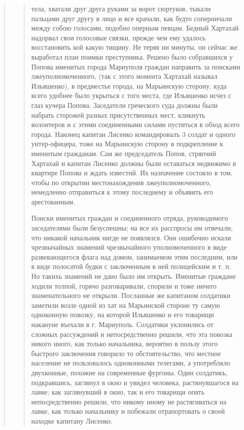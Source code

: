 \begin{quote}
\begin{quote}
тела, хватали друг друга руками за ворот сюртуков, тыкали пальцами друг другу в
лицо и все крачали, как будто соперничали между собою голосами, подобно оперным
певцам. 
Бедный Хартахай надорвал свои голосовые связки, прежде чем ему удалось
восстановить кой какую тищину. Не теряя ни минуты, он сейчас же выработал план
поимки преступника. Решено было собравшихся у Попова именитых города Мариуполя
граждан направить за поисками лжеуполномоченного, (так с этого момента Хартахай
называл Ильяшенко), в предместье города, на Марьинскую сторону, куда всего
удобнее было укрыться с того места, где Ильяшенко исчез с глаз кучера Попова.
Заседатели греческого суда должны были набрать сторожей разных присутственных
мест, кликнуть волонтеров и с этими соединенными силами пуститься в обход всего
города. Наконец капитан Лисенко командировалъ 3 солдат и одного унтер-офицера,
тоже на Марьинскую сторону в подкрепление к именитым гражданам. Сам же
председатель Попов, стряпчий Хартахай и капитан Лисенко должны были оставаться
недвижимо в квартире Попова и ждать известий. Их назпачение состояло в том,
чтобы по открытии местонахождения лжеуполномоченного, немедленно отправиться к
этому последнему и объявить его арестованным.

Поиски именитых граждан и соединенного отряда, руководимого заседателями были безуспешны;
на все их расспросы им отвечали, что никакой начальник нигде не появлялся. Они ошибочно искали
чрезвычайных знамений чрезвычайного уполномоченного в виде развевающегося флага
над домом, занимаемом этим последним, или в виде полосатой будки с заключенным в ней полицейским и т. п.
Но такихь знамений не дано было им открыть. Именитые граждане ходили толпой, 
горячо разговаривали, спорили и тоже ничего знаменательного не открыли. Посланные
же капитаном солдатики заметили возле одной из хат
на Марьинской стороне ту самую одноконную повозку, на
которой Ильяшенко и его товарищи накануне въехали в
г. Мариуполь. Солдатики уклонились от сложных рассуждений
и непосредственно решили, что эта повозка никого
иного, как только начальника, вероятно в пользу этого
быстрого заключения говорило то обстоятельство, что местное
население не пользовалось одноконными телегами, а употребляло двухконные, 
похожие на современные фургоны. Один
солдатикъ, подкравшись, заглянул в окно и увидел человека, 
растянувшагося на лавке; как заглянувший в окно,
так и его товарищи опять непосредственно решили, что
никому иному не растягиваться на лавке, как только начальнику и 
побежали отрапортовать о своей находке капитану Лисенко.


\end{quote}
\end{quote}
